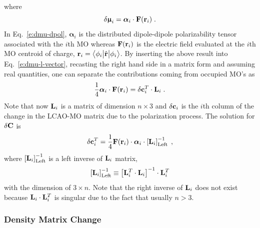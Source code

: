 \documentclass[aip,amsmath,amssymb,reprint,floatfix]{revtex4-1}
\newcommand{\tbraket}[3]{\ensuremath{\bigl\langle {#1} \bigl\lvert {#2} \bigl\lvert {#3} \bigr\rangle}}
\newcommand{\BM}[1]{\bm{#1}}
\begin{document}
%
where
%
\begin{equation} \label{e:dmu-dpol}
 \delta {\BM{\upmu}}_i = {\BM{\alpha}}_i \cdot {\bf F}({\bf r}_i) \;.
\end{equation}
%
In Eq.~\eqref{e:dmu-dpol}, ${\BM{\alpha}}_i$ is the distributed dipole\hyp{}dipole polarizability tensor
associated with the $i$th MO whereas ${\bf F}({\bf r}_i)$ is the electric field evaluated at the $i$th MO centroid of charge,
${\bf r}_i = \tbraket{\phi_i}{\hat{\bf r}}{\phi_i}$.
By inserting the above result into Eq.~\eqref{e:dmu-l-vector},
recasting the right hand side in a matrix form
and assuming real quantities,
one can separate the contributions coming from occupied MO's as
%
\begin{equation} \label{e:dmu-l-vector-mo-transform-X}
 \frac{1}{4} {\BM{\alpha}}_i \cdot {\bf F}({\bf r}_i) 
   =
   \delta {\bf c}_i^T \cdot {\bf L}_i \;.
\end{equation}
%
Note that now ${\bf L}_i$ is a matrix of dimension $n \times 3$ and $\delta{\bf c}_i$ is the $i$th column of the
change in the LCAO-MO matrix due to the polarization process.
The solution for $\delta {\bf C}$ is
%
\begin{equation} \label{e:mu-ind.matrix.linear.solution}
  \delta {\bf c}_i^T = \frac{1}{4}
            {\bf F}({\bf r}_i)  \cdot {\BM{\alpha}}_i \cdot 
                    \left[ {\bf L}_i  \right]^{-1}_{\rm Left} \;,
\end{equation}
%
where $\left[ {\bf L}_i  \right]^{-1}_{\rm Left}$ is a left inverse
of ${\bf L}_i$ matrix,
%
\begin{equation} 
      \left[ {\bf L}_i  \right]^{-1}_{\rm Left}   \equiv
       \left[ {\bf L}_i^T \cdot {\bf L}_i \right]^{-1} \cdot {\bf L}_i^T   
\end{equation}
%
with the dimension of $3\times n$. Note that the right inverse of ${\bf L}_i$
does not exist because ${\bf L}_i \cdot {\bf L}_i^T$ is singular due to the fact that usually
$n > 3$.

\subsubsection{Density Matrix Change}
\end{document}
